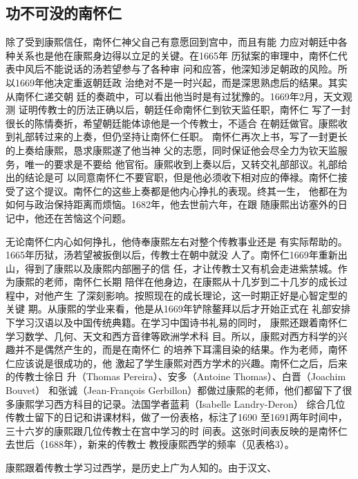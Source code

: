 \subsection{功不可没的南怀仁}
\par
除了受到康熙信任，南怀仁神父自己有意愿回到宫中，而且有能%
力应对朝廷中各种关系也是他在康熙身边得以立足的关键。在1665年%
历狱案的审理中，南怀仁代表中风后不能说话的汤若望参与了各种审%
问和应答，他深知涉足朝政的风险。所以1669年他决定重返朝廷政%
治绝对不是一时兴起，而是深思熟虑后的结果。其实从南怀仁递交朝%
廷的奏疏中，可以看出他当时是有过犹豫的。1669年2月，天文观测%
证明传教士的历法正确以后，朝廷任命南怀仁到钦天监任职，南怀仁%
写了一封很长的陈情奏折，希望朝廷能体谅他是一个传教士，不适合%
在朝廷做官。康熙收到礼部转过来的上奏，但仍坚持让南怀仁任职。%
南怀仁再次上书，写了一封更长的上奏给康熙，恳求康熙遂了他当神%
父的志愿，同时保证他会尽全力为钦天监服务，唯一的要求是不要给%
他官衔。康熙收到上奏以后，又转交礼部部议。礼部给出的结论是可%
以同意南怀仁不要官职，但是他必须收下相对应的俸禄。南怀仁接%
受了这个提议。南怀仁的这些上奏都是他内心挣扎的表现。终其一生，%
他都在为如何与政治保持距离而烦恼。1682年，他去世前六年，在跟%
随康熙出访塞外的日记中，他还在苦恼这个问题。%
\par
无论南怀仁内心如何挣扎，他侍奉康熙左右对整个传教事业还是%
有实际帮助的。1665年历狱，汤若望被扳倒以后，传教士在朝中就没%
人了。南怀仁1669年重新出山，得到了康熙以及康熙内部圈子的信%
任，才让传教士又有机会走进紫禁城。作为康熙的老师，南怀仁长期%
陪伴在他身边，在康熙从十几岁到二十几岁的成长过程中，对他产生%
了深刻影响。按照现在的成长理论，这一时期正好是心智定型的关键%
期。从康熙的学业来看，他是从1669年铲除鳌拜以后才开始正式在%
礼部安排下学习汉语以及中国传统典籍。在学习中国诗书礼易的同时，%
康熙还跟着南怀仁学习数学、几何、天文和西方音律等欧洲学术科%
目。所以，康熙对西方科学的兴趣并不是偶然产生的，而是在南怀仁%
的培养下耳濡目染的结果。作为老师，南怀仁应该说是很成功的，他%
激起了学生康熙对西方学术的兴趣。南怀仁之后，后来的传教士徐日%
升（Thomas Pereira）、安多（Antoine Thomas）、白晋（Joachim Bouvet）%
和张诚（Jean-François Gerbillon）都做过康熙的老师，他们都留下了很%
多康熙学习西方科目的记录。法国学者蓝莉（Isabelle Landry-Deron）%
综合几位传教士留下的日记和讲课材料，做了一份表格，标注了1690%
至1691两年时间中，三十六岁的康熙跟几位传教士在宫中学习的时%
间表。这张时间表反映的是南怀仁去世后（1688年），新来的传教士%
教授康熙西学的频率（见表格3）。%
\par
康熙跟着传教士学习过西学，是历史上广为人知的。由于汉文、%
